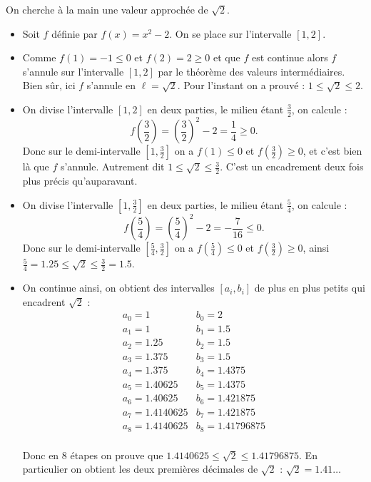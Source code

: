 \documentclass[11pt,class=report,crop=false]{standalone}
\begin{document}
\begin{cours}[Dichotomie]
\begin{exemple}
On cherche \og{}à la main\fg{} une valeur approchée de $\sqrt{2}$.

\begin{itemize}
  \item Soit $f$ définie par $f(x)=x^2-2$. On se place sur l'intervalle $[1,2]$.
  \item Comme $f(1)=-1\le0$ et $f(2)=2\ge0$ et que $f$ est continue alors $f$ s'annule sur l'intervalle $[1,2]$ par le théorème des valeurs intermédiaires. Bien sûr, ici $f$ s'annule en $\ell = \sqrt{2}$. Pour l'instant on a prouvé : $1 \le \sqrt 2 \le 2$.
  \item On divise l'intervalle $[1,2]$ en deux parties, le milieu étant $\frac32$, on calcule :
  $$f\left(\frac32\right)= \left(\frac32\right)^2-2 = \frac14 \ge 0.$$
  Donc sur le demi-intervalle $[1,\frac32]$ on a $f(1) \le 0$ et $f(\frac32) \ge 0$, et c'est bien là que $f$ s'annule. Autrement dit 
  $1 \le \sqrt{2} \le \frac32$. C'est un encadrement deux fois plus précis qu'auparavant.
  
  \item On divise l'intervalle $[1,\frac32]$ en deux parties, le milieu étant $\frac54$, on calcule :
  $$f\left(\frac54\right)= \left(\frac54\right)^2-2 = -\frac{7}{16} \le 0.$$
  Donc sur le demi-intervalle $[\frac54,\frac32]$ on a 
  $f(\frac54) \le 0$ et $f(\frac32) \ge 0$, ainsi 
  $\frac54 = 1.25 \le \sqrt{2} \le \frac32 = 1.5$.
  
  \item On continue ainsi, on obtient des intervalles $[a_i,b_i]$ de plus en plus petits qui encadrent $\sqrt2$ :
$$
\begin{array}{ll}
  a_0 = 1      & b_0 = 2 \\
  a_1 = 1      & b_1 = 1.5 \\
  a_2 = 1.25   & b_2 = 1.5 \\
  a_3 = 1.375  & b_3 = 1.5 \\
  a_4 = 1.375  & b_4 = 1.4375 \\
  a_5 = 1.40625 & b_5 = 1.4375 \\
  a_6 = 1.40625 & b_6 = 1.421875 \\
  a_7 = 1.4140625 & b_7 = 1.421875 \\
  a_8 = 1.4140625 & b_8 = 1.41796875 \\
\end{array}
$$

Donc en $8$ étapes on prouve que $1.4140625 \le \sqrt2 \le 1.41796875$. En particulier on obtient les deux premières décimales de $\sqrt2$ : $\sqrt2 = 1.41\ldots$
\end{itemize}


\end{exemple}

\end{cours}
\end{document}
